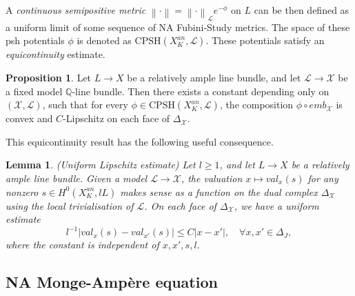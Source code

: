 \documentclass[a4paper]{article}
\newtheorem{lem}[thm]{Lemma}
\theoremstyle{definition}
\newtheorem{prop}[thm]{Proposition}
\newcommand{\Q}{\mathbb{Q}}
\newcommand{\norm}[1]{\left\lVert#1\right\rVert}
\begin{document}
	
	
	
	
	
	
	A \emph{continuous semipositive metric} $\norm{\cdot}=\norm{\cdot}_{\mathcal{L}}e^{-\phi}$ on $L$ can be then defined as a uniform limit of some sequence of NA Fubini-Study metrics. The space of these psh potentials $\phi$ is denoted as $\text{CPSH}(X_K^{an}, \mathcal{L})$. These potentials satisfy an \emph{equicontinuity} estimate.
	
	
	\begin{prop}\cite[Chapter 6]{Boucksomsemipositive}
	Let $L\to X$ be a relatively ample line bundle, and let $\mathcal{L}\to \mathcal{X}$ be a fixed model $\Q$-line bundle. Then there exists a constant depending only on $(\mathcal{X},\mathcal{L})$, such that for every $\phi\in \text{CPSH}(X_K^{an}, \mathcal{L})$, the composition $\phi\circ emb_{\mathcal{X}}$ is convex and $C$-Lipschitz on each face of $\Delta_\mathcal{X}$.
	\end{prop}
	
	
	
	
	
This equicontinuity result has the following useful consequence.
	
	
	
	\begin{lem}\cite[Lemma 2.3]{Litheta}\label{lem:Lip}
		(Uniform Lipschitz estimate)
		Let $l\geq 1$, and let $L\to X$ be a relatively ample line bundle. Given a model $\mathcal{L}\to \mathcal{X}$, the valuation $x\mapsto val_x(s)$ for any nonzero $s\in H^0(X_K^{an}, lL)$ makes sense as a function on the dual complex $\Delta_{\mathcal{X}}$ using the local trivialisation of $\mathcal{L}$. On each face of $\Delta_{\mathcal{X}}$, we have a uniform estimate
		\[
		l^{-1}|val_x(s)- val_{x'}(s) | \leq C|x-x'|, \quad \forall x,x'\in \Delta_J,
		\]
		where the constant is independent of $x,x',s,l$.
	\end{lem}
	
	

	
	
	
	
	
	
	
	
	\subsection{NA Monge-Amp\`ere equation}\label{sec:NAMAeqn}
	
	
	
	
	
\end{document}

